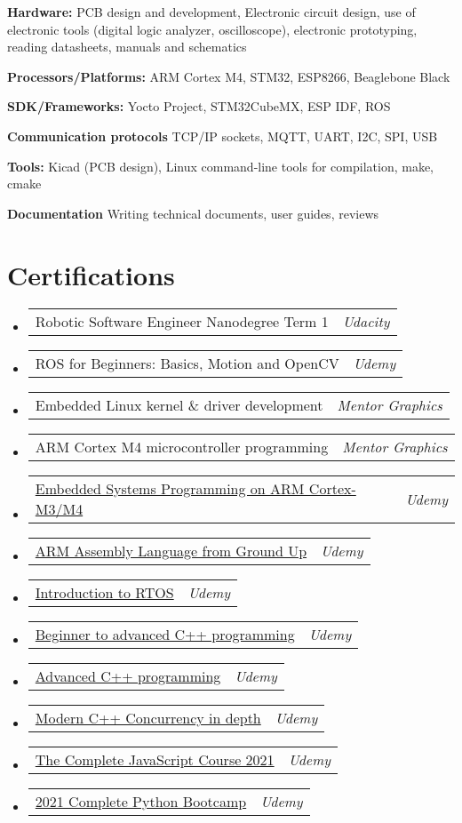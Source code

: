 \documentclass[a4paper,11pt]{article}
\makeatletter
\newcommand{\liststart}{\begin{itemize}[leftmargin=10pt]}
\newcommand{\listend}{\end{itemize}}
\newcommand{\listitemone}{\item}
\newcommand{\skill}[2] {
    \textbf{#1} #2 \\
    \vspace {3pt}
}
\newcommand{\cert}[2] {
    \listitemone
	\begin{tabular*}{7.1in}{l@{\extracolsep{\fill}}r}
	    {#1} & \textit{#2}
	\end{tabular*}\vspace{-6pt}
}
\makeatother
\begin{document}
\skill{Hardware:} {PCB design and development, Electronic circuit design,               use of electronic tools (digital logic analyzer, oscilloscope),
                   electronic prototyping, reading
                   datasheets, manuals and schematics}

\skill{Processors/Platforms:} {ARM Cortex M4, STM32, ESP8266, Beaglebone Black}

\skill{SDK/Frameworks:} {Yocto Project, STM32CubeMX, ESP IDF, ROS}

\skill{Communication protocols} {TCP/IP sockets, MQTT, UART, I2C, SPI, USB}

\skill{Tools:} {Kicad (PCB design), Linux command-line tools for 	  	 		            compilation, make, cmake}

\skill{Documentation} {Writing technical documents, user guides, reviews}


\vspace{0.005in}
\vspace{0.005in}
\section{Certifications}
\liststart
    \cert{Robotic Software Engineer Nanodegree Term 1}{Udacity}
    \cert{ROS for Beginners: Basics, Motion and OpenCV}{Udemy}
    \cert{Embedded Linux kernel \& driver development}{Mentor Graphics}
    \cert{ARM Cortex M4 microcontroller programming}{Mentor Graphics}
    \cert{\href{https://www.udemy.com/certificate/UC-014143dc-66f6-4203-addc-3c255e54ddbb/}{Embedded Systems Programming on ARM Cortex-M3/M4}}	  	          {Udemy}
    \cert{\href{https://www.udemy.com/certificate/UC-39a37dc0-8a26-4721-a7f4-61e2600e380e}{ARM Assembly Language from Ground Up}}	  	          {Udemy}
    \cert{\href{https://www.udemy.com/certificate/UC-A7SUDAR3/}				          {Introduction to RTOS}}{Udemy}
    \cert{\href{https://www.udemy.com/certificate/UC-A3NT02MS/}{Beginner 		      to advanced C++ programming}}{Udemy}
    \cert{\href{https://www.udemy.com/certificate/UC-VRNTEUJM/}{Advanced C++ programming}}{Udemy}
    \cert{\href{https://www.udemy.com/certificate/UC-0RLGR3RM/}{Modern C++ 		  Concurrency in depth}}{Udemy}
    \cert{\href{https://www.udemy.com/certificate/UC-b6b01a07-f2f0-4e2f-add1-37981acecf1f/}{The Complete JavaScript Course 2021}}{Udemy}
    \cert{\href{https://www.udemy.com/certificate/UC-11f326fc-276b-4cee-b3bf-1cb8c1529cc1/}{ 2021 Complete Python Bootcamp}}{Udemy}
\listend


\vspace{0.005in}
\end{document}
